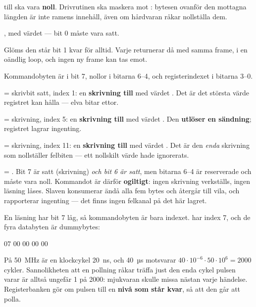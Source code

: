  till  ska vara \textbf{noll}. Drivrutinen ska maskera mot
: bytesen ovanför den mottagna längden är inte ramens innehåll, även om hårdvaran råkar
nollställa dem.

 , med värdet  --- bit 0 måste vara satt.

Glöms den står  bit 1 kvar för alltid. Varje  returnerar då
 med samma frame, i en oändlig loop, och ingen ny frame kan tas emot.

Kommandobyten är  i bit 7, nollor i bitarna 6--4, och registerindexet i bitarna 3--0.

  = skrivbit satt, index 1: en \textbf{skrivning till } med värdet
. Det är det största värde registret kan hålla --- elva bitar ettor.

  = skrivning, index 5: en \textbf{skrivning till } med värdet
. Den \textbf{utlöser en sändning}; registret lagrar ingenting.

  = skrivning, index 11: en \textbf{skrivning till } med värdet
. Det är den \emph{enda} skrivning som nollställer felbiten --- ett nollskilt värde hade
ignorerats.

  = . Bit 7 är satt (skrivning) \emph{och bit 6 är satt}, men
bitarna 6--4 är reserverade och måste vara noll. Kommandot är därför \textbf{ogiltigt}: ingen
skrivning verkställs, ingen läsning låses. Slaven konsumerar ändå alla fem bytes och återgår till
vila, och rapporterar ingenting --- det finns ingen felkanal på det här lagret.

 En läsning har bit 7 låg, så kommandobyten är bara indexet.  har index 7, och
de fyra databyten är dummybytes:

\begin{console}
07 00 00 00 00
\end{console}

 På 50~MHz är en klockcykel 20~ns, och 40~µs motsvarar $40 \cdot 10^{-6} \cdot 50 \cdot
10^{6} = 2000$ cykler. Sannolikheten att en pollning råkar träffa just den enda cykel pulsen varar
är alltså ungefär 1 på 2000: mjukvaran skulle missa nästan varje händelse. Registerbanken gör om
pulsen till en \textbf{nivå som står kvar}, så att den går att polla.

